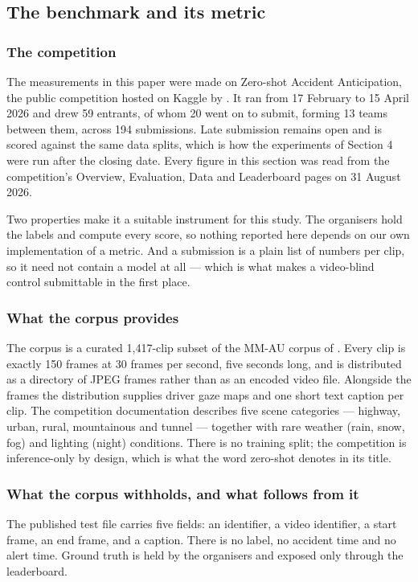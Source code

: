\subsection{The benchmark and its metric}

\subsubsection{The competition}
The measurements in this paper were made on Zero-shot Accident Anticipation, the public competition hosted on Kaggle by \citet{autopilot2026}. It ran from 17 February to 15 April 2026 and drew 59 entrants, of whom 20 went on to submit, forming 13 teams between them, across 194 submissions. Late submission remains open and is scored against the same data splits, which is how the experiments of Section 4 were run after the closing date. Every figure in this section was read from the competition's Overview, Evaluation, Data and Leaderboard pages on 31 August 2026.

Two properties make it a suitable instrument for this study. The organisers hold the labels and compute every score, so nothing reported here depends on our own implementation of a metric. And a submission is a plain list of numbers per clip, so it need not contain a model at all --- which is what makes a video-blind control submittable in the first place.

\subsubsection{What the corpus provides}
The corpus is a curated 1,417-clip subset of the MM-AU corpus of \citet{fang2024mmau}. Every clip is exactly 150 frames at 30 frames per second, five seconds long, and is distributed as a directory of JPEG frames rather than as an encoded video file. Alongside the frames the distribution supplies driver gaze maps and one short text caption per clip. The competition documentation describes five scene categories --- highway, urban, rural, mountainous and tunnel --- together with rare weather (rain, snow, fog) and lighting (night) conditions. There is no training split; the competition is inference-only by design, which is what the word zero-shot denotes in its title.

\subsubsection{What the corpus withholds, and what follows from it}
The published test file carries five fields: an identifier, a video identifier, a start frame, an end frame, and a caption. There is no label, no accident time and no alert time. Ground truth is held by the organisers and exposed only through the leaderboard.

